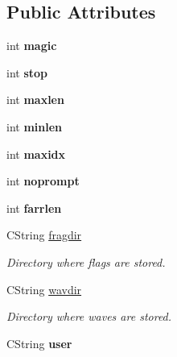 \subsection*{Public Attributes}
\begin{DoxyCompactItemize}
\item 
\hypertarget{class_c_frag_coll_a7ef7f3c881de69316484752e48d17204}{int {\bfseries magic}}\label{class_c_frag_coll_a7ef7f3c881de69316484752e48d17204}

\item 
\hypertarget{class_c_frag_coll_aa7f7a2301a0adc206e59f50b45f2dcf9}{int {\bfseries stop}}\label{class_c_frag_coll_aa7f7a2301a0adc206e59f50b45f2dcf9}

\item 
\hypertarget{class_c_frag_coll_a526d5c7362210db8efee9cec145d356e}{int {\bfseries maxlen}}\label{class_c_frag_coll_a526d5c7362210db8efee9cec145d356e}

\item 
\hypertarget{class_c_frag_coll_a92a2d1bb78de66278f91a81c12ba8877}{int {\bfseries minlen}}\label{class_c_frag_coll_a92a2d1bb78de66278f91a81c12ba8877}

\item 
\hypertarget{class_c_frag_coll_af1a33e5f9766659793367b51dcd73cdc}{int {\bfseries maxidx}}\label{class_c_frag_coll_af1a33e5f9766659793367b51dcd73cdc}

\item 
\hypertarget{class_c_frag_coll_afc976541c77fd482aa6e70ca69be114d}{int {\bfseries noprompt}}\label{class_c_frag_coll_afc976541c77fd482aa6e70ca69be114d}

\item 
\hypertarget{class_c_frag_coll_a33f88683e069a43848b92f545734bc1d}{int {\bfseries farrlen}}\label{class_c_frag_coll_a33f88683e069a43848b92f545734bc1d}

\item 
\hypertarget{class_c_frag_coll_a8f6d4bb169cd517484fc3492aa3d5ce6}{C\-String \hyperlink{class_c_frag_coll_a8f6d4bb169cd517484fc3492aa3d5ce6}{fragdir}}\label{class_c_frag_coll_a8f6d4bb169cd517484fc3492aa3d5ce6}

\begin{DoxyCompactList}\small\item\em Directory where flags are stored. \end{DoxyCompactList}\item 
\hypertarget{class_c_frag_coll_acb9ee3e1eac3b69f6912134ee93f0d77}{C\-String \hyperlink{class_c_frag_coll_acb9ee3e1eac3b69f6912134ee93f0d77}{wavdir}}\label{class_c_frag_coll_acb9ee3e1eac3b69f6912134ee93f0d77}

\begin{DoxyCompactList}\small\item\em Directory where waves are stored. \end{DoxyCompactList}\item 
\hypertarget{class_c_frag_coll_af0866615fbc1287f352af26035c71ef1}{C\-String {\bfseries user}}\label{class_c_frag_coll_af0866615fbc1287f352af26035c71ef1}

\end{DoxyCompactItemize}
